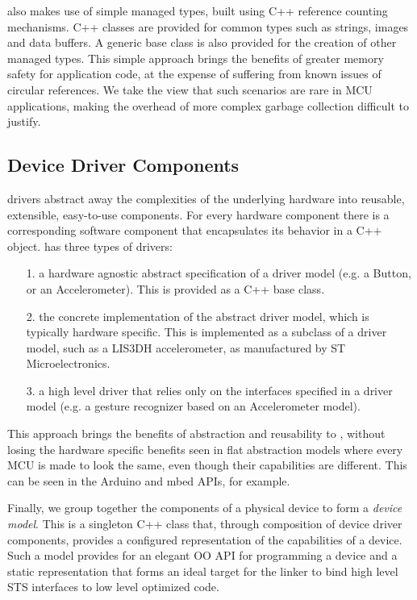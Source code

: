 \CO also makes use of simple managed types, built using C++ reference counting mechanisms. C++ classes are provided for common types such as strings, images and data buffers. A generic base class is also provided for the creation of other managed types. This simple approach brings the benefits of greater memory safety for application code, at the expense of suffering from known issues of circular references. We take the view that such scenarios are rare in MCU applications, making the overhead of more complex garbage collection difficult to justify.

\subsection{Device Driver Components}
\CO drivers abstract away the complexities of the underlying hardware into reusable, extensible, easy-to-use components. For every hardware component there is a corresponding software component that encapsulates its behavior in a C++ object. \CO has three types of drivers:
\begin{itemize}
    \item[1.] a hardware agnostic abstract specification of a driver model (e.g. a Button, or an Accelerometer). This is provided as a C++ base class.
    \item[2.] the concrete implementation of the abstract driver model, which is typically hardware specific. This is implemented as a subclass of a driver model, such as a LIS3DH accelerometer, as manufactured by ST Microelectronics.
    \item[3.] a high level driver that relies only on the interfaces specified in a driver model (e.g. a gesture recognizer based on an Accelerometer model).
\end{itemize}

This approach brings the benefits of abstraction and reusability to \CON, without losing the hardware specific benefits seen in flat abstraction models where every MCU is made to look the same, even though their capabilities are different. This can be seen in the Arduino and mbed APIs, for example.

Finally, we group together the components of a physical device to form a \emph{device model}. This is a singleton C++ class that, through composition of device driver components, provides a configured representation of the capabilities of a device. Such a model provides for an elegant OO API for programming a device and a static representation that forms an ideal target for the \MC linker to bind high level STS interfaces to low level optimized code.

